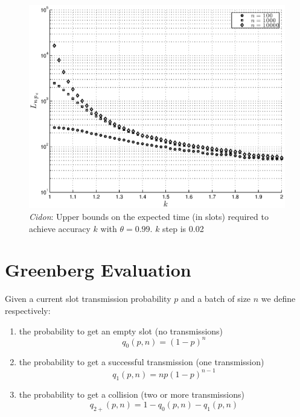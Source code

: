 \documentclass[12pt,a4paper]{report}
\begin{document}
\begin{figure}[htb!]
\begin{center}
\includegraphics[scale=0.7]{matlab/Cidon/cidon-k-L-minimum}
\caption[\emph{Cidon}: Upper bounds on the expected time (in slots) required to achieve accuracy $k$]{\emph{Cidon}: Upper bounds on the expected time (in slots) required to achieve accuracy $k$ with $\theta=0.99$. $k$ step is 0.02}
\label{cidon-k-L-minimum}
\end{center}
\end{figure}

\section{Greenberg Evaluation}
Given a current slot transmission probability $p$ and a batch of size $n$ we define respectively:
\begin{enumerate}
\item the probability to get an empty slot (no transmissions)
\begin{equation}q_{0}(p,n)=(1-p)^{n} \label{eq:greenberg-prob-empty}\end{equation}
\item the probability to get a successful transmission (one transmission)
\begin{equation}q_{1}(p,n)=n p (1-p)^{n-1} \label{eq:greenberg-prob-succ}\end{equation} 
\item the probability to get a collision (two or more transmissions)
\begin{equation}q_{2+}(p,n)=1-q_{0}(p,n)-q_{1}(p,n)\label{eq:greenberg-prob-coll}\end{equation}
\end{enumerate}
\end{document}
